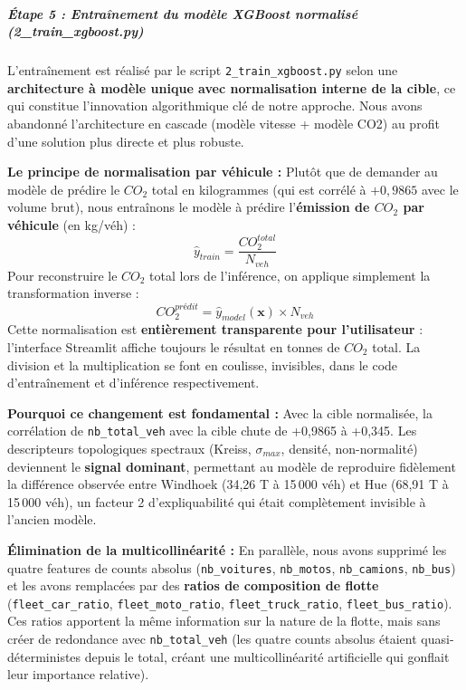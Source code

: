 \documentclass[10pt, a4paper]{article}
\begin{document}
\subparagraph{Étape 5 : Entraînement du modèle XGBoost normalisé
(2\_train\_xgboost.py)}\label{uxe9tape-5-entrauxeenement-du-moduxe8le-xgboost-normalisuxe9-2_train_xgboost.py}

L'entraînement est réalisé par le script \texttt{2\_train\_xgboost.py}
selon une \textbf{architecture à modèle unique avec normalisation
interne de la cible}, ce qui constitue l'innovation algorithmique clé de
notre approche. Nous avons abandonné l'architecture en cascade (modèle
vitesse + modèle CO2) au profit d'une solution plus directe et plus
robuste.

\textbf{Le principe de normalisation par véhicule :} Plutôt que de
demander au modèle de prédire le \(CO_2\) total en kilogrammes (qui est
corrélé à \(+0,9865\) avec le volume brut), nous entraînons le modèle à
prédire l'\textbf{émission de \(CO_2\) par véhicule} (en kg/véh) :
\[\hat{y}_{train} = \frac{CO_2^{total}}{N_{veh}}\] Pour reconstruire le
\(CO_2\) total lors de l'inférence, on applique simplement la
transformation inverse :
\[CO_2^{prédit} = \hat{y}_{model}(\mathbf{x}) \times N_{veh}\] Cette
normalisation est \textbf{entièrement transparente pour l'utilisateur} :
l'interface Streamlit affiche toujours le résultat en tonnes de \(CO_2\)
total. La division et la multiplication se font en coulisse, invisibles,
dans le code d'entraînement et d'inférence respectivement.

\textbf{Pourquoi ce changement est fondamental :} Avec la cible
normalisée, la corrélation de \texttt{nb\_total\_veh} avec la cible
chute de +0,9865 à +0,345. Les descripteurs topologiques spectraux
(Kreiss, \(\sigma_{max}\), densité, non-normalité) deviennent le
\textbf{signal dominant}, permettant au modèle de reproduire fidèlement
la différence observée entre Windhoek (34,26 T à 15\,000 véh) et Hue
(68,91 T à 15\,000 véh), un facteur 2 d'expliquabilité qui était
complètement invisible à l'ancien modèle.

\textbf{Élimination de la multicollinéarité :} En parallèle, nous avons
supprimé les quatre features de counts absolus (\texttt{nb\_voitures},
\texttt{nb\_motos}, \texttt{nb\_camions}, \texttt{nb\_bus}) et les avons
remplacées par des \textbf{ratios de composition de flotte}
(\texttt{fleet\_car\_ratio}, \texttt{fleet\_moto\_ratio},
\texttt{fleet\_truck\_ratio}, \texttt{fleet\_bus\_ratio}). Ces ratios
apportent la même information sur la nature de la flotte, mais sans
créer de redondance avec \texttt{nb\_total\_veh} (les quatre counts
absolus étaient quasi-déterministes depuis le total, créant une
multicollinéarité artificielle qui gonflait leur importance relative).
\end{document}
